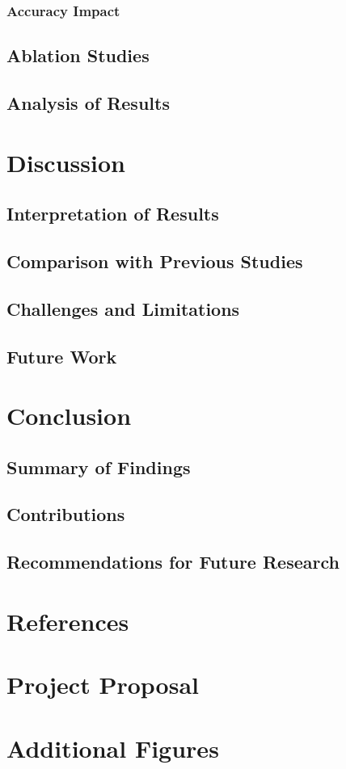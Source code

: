 \documentclass[11pt]{article}
\begin{document}
  \subsubsection{Accuracy Impact}

  \subsection{Ablation Studies}

  \subsection{Analysis of Results}

\section{Discussion}
  \subsection{Interpretation of Results}
  \subsection{Comparison with Previous Studies}
  \subsection{Challenges and Limitations}
  \subsection{Future Work}

\section{Conclusion}
\subsection{Summary of Findings}

\subsection{Contributions}

\subsection{Recommendations for Future Research}

\section{References}



\appendix
\section{Project Proposal}

\section{Additional Figures}
\end{document}
